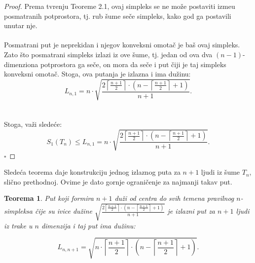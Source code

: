 \documentclass[11pt,letter]{article}
\newtheorem{teo}{\bf Teorema}[section]
\newcommand{\qed}{\hfill $\square$ \bigskip}
\begin{document}
\begin{proof}
Prema tvr\dj enju Teoreme 2.1, ovaj simpleks se ne mo\v ze postaviti izme\dj u posmatranih potprostora, tj. rub \v sume se\v ce simpleks, kako god ga postavili unutar nje.
\\
\\
\indent Posmatrani put je neprekidan i njegov konveksni omota\v c je ba\v s ovaj simpleks. Zato \v sto posmatrani simpleks izlazi iz ove \v sume, tj. jedan od ova dva $(n-1)$-dimenziona potprostora ga se\v ce, on mora da se\v ce i put \v ciji je taj simpleks konveksni omota\v c. Stoga, ova putanja je izlazna i ima du\v zinu:
\\
$$L_{n,1}=n\cdot \sqrt{\frac{2\left\lceil \frac{n+1}{2}\right\rceil\cdot \left( n-\left\lceil\frac{n+1}{2}\right\rceil+1\right)}{n+1}}. $$
\\
\\
\indent Stoga, va\v zi slede\' ce:
$$S_1(T_n)\leqslant L_{n, 1}=n\cdot \sqrt{\frac{2\left\lceil \frac{n+1}{2}\right\rceil\cdot \left( n-\left\lceil\frac{n+1}{2}\right\rceil+1\right)}{n+1}}.$$\qed
\end{proof}

\indent Slede\' ca teorema daje konstrukciju jednog izlaznog puta za $n+1$ ljudi iz \v sume $T_n$, sli\v cno prethodnoj. Ovime je dato gornje ograni\v cenje za najmanji takav put.


\bigskip
\begin{teo} Put koji formira $n+1$ du\v zi od centra do svih temena pravilnog $n$-simpleksa  \v cije su ivice du\v zine $\sqrt{\frac{2\left\lceil \frac{n+1}{2}\right\rceil\cdot \left( n-\left\lceil\frac{n+1}{2}\right\rceil+1\right)}{n+1}}$ je izlazni put za $n+1$ ljudi iz trake u $n$ dimenzija i taj put ima du\v zinu:

$$L_{n,n+1}=\sqrt{n\cdot\left\lceil\frac{n+1}{2}\right\rceil\cdot\left( n-\left\lceil\frac{n+1}{2}\right\rceil+1\right)}.$$\end{teo}
\end{document}
